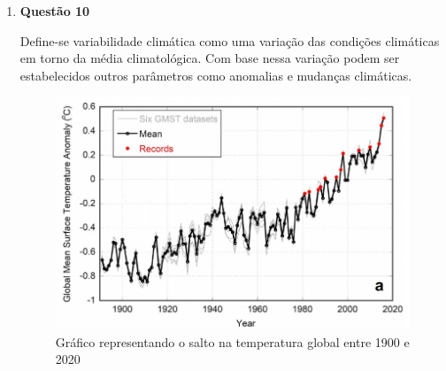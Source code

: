 \documentclass[a4paper, 12pt]{article}
\begin{document}
\begin{enumerate}
		\item[]\textbf{Questão 10} 
		
		\hspace{1cm}Define-se variabilidade climática como uma variação das condições climáticas em torno da média climatológica. Com base nessa variação podem ser estabelecidos outros parâmetros como anomalias e mudanças climáticas.
		
		\begin{figure}[!h]
			\centering
			\includegraphics[scale=.65]{images/graphic.jpg}
			\caption{Gráfico representando o salto na temperatura global entre 1900 e 2020}
		\end{figure}
	\end{enumerate}
\end{document}
